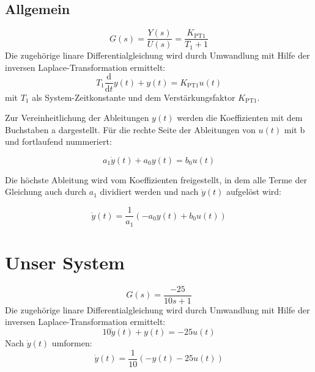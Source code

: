 \subsection*{Allgemein}
\begin{equation*}
  G(s) = \frac{Y(s)}{U(s)} = \frac{K_\text{PT1}}{T_1+1}
\end{equation*}
Die zugehörige linare Differentialgleichung wird durch Umwandlung mit Hilfe der inversen Laplace-Transformation ermittelt:
\begin{equation*}
  T_1\frac{\mathrm d}{\mathrm dt}y(t)+y(t)=K_\text{PT1}u(t)
\end{equation*}
mit $T_1$ als System-Zeitkonstante und dem Verstärkungsfaktor $K_\text{PT1}$.

Zur Vereinheitlichung der Ableitungen $y(t)$ werden die Koeffizienten mit dem Buchstaben a dargestellt.
Für die rechte Seite der Ableitungen von $u(t)$ mit b und fortlaufend nummeriert:

\begin{equation*}
  a_1\dot y(t)+a_0y(t) = b_0u(t)
\end{equation*}

Die höchste Ableitung wird vom Koeffizienten freigestellt, in dem alle Terme der Gleichung auch durch $a_1$ dividiert werden und nach $\dot y(t)$ aufgelöst wird:

\begin{equation*}
  \dot y(t)= \frac{1}{a_1}(-a_0y(t) +b_0u(t))
\end{equation*}

\section*{Unser System}
\begin{equation*}
  G(s)=\frac{-25}{10s+1}
\end{equation*}
Die zugehörige linare Differentialgleichung wird durch Umwandlung mit Hilfe der inversen Laplace-Transformation ermittelt:
\begin{equation*}
  10\dot y(t)+y(t)= -25u(t)
\end{equation*}
Nach $\dot y(t)$ umformen:
\begin{equation*}
  \dot y(t)= \frac{1}{10}(-y(t)-25u(t))
\end{equation*}